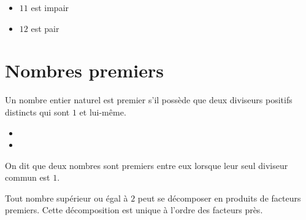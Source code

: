 \begin{Exemple}
\leavevmode\vspace{-\baselineskip}
\begin{itemize}[label=\textcolor{Couleur8}{$\bullet$}]
\item $11$ est impair \ligne

\item $12$ est pair \ligne

\end{itemize}
\end{Exemple}



\section{Nombres premiers}

\begin{Définition}
Un nombre entier naturel est premier s'il possède que deux diviseurs positifs distincts qui sont $1$ et lui-même.
\end{Définition}

\begin{Exemple}
\leavevmode\vspace{-\baselineskip}
\begin{itemize}[label=\textcolor{Couleur8}{$\bullet$}]
\item \ligne

\item \ligne

\end{itemize}
\end{Exemple}

\begin{Définition}
On dit que deux nombres sont premiers entre eux lorsque leur seul
diviseur commun est $1$.
\end{Définition}

\newpage

\begin{Propriété}
Tout nombre supérieur ou égal à $2$ peut se décomposer en produits de facteurs premiers. Cette décomposition est unique à l'ordre des facteurs près.
\end{Propriété}

\begin{Exemple}
\vspace{0.1cm}

\ligne

\ligne

\end{Exemple}

